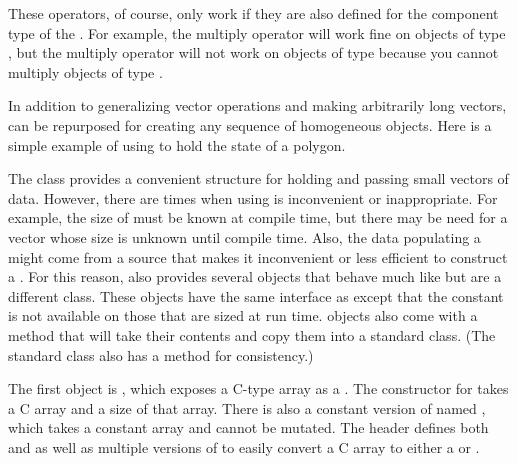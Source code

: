 
These operators, of course, only work if they are also defined for the
component type of the . For example, the multiply operator will
work fine on objects of type , but the multiply
operator will not work on objects of type 
because you cannot multiply objects of type .

In addition to generalizing vector operations and making arbitrarily long
vectors,  can be repurposed for creating any sequence of
homogeneous objects. Here is a simple example of using  to hold
the state of a polygon.



The  class provides a convenient structure for holding and passing small vectors of data.
However, there are times when using  is inconvenient or inappropriate.
For example, the size of  must be known at compile time, but there may be need for a vector whose size is unknown until compile time.
Also, the data populating a  might come from a source that makes it inconvenient or less efficient to construct a .
For this reason, \VTKm also provides several \keyterm{\Veclike} objects that behave much like  but are a different class.
These \Veclike objects have the same interface as  except that the  constant is not available on those that are sized at run time.
\Veclike objects also come with a  method that will take their contents and copy them into a standard  class.
(The standard  class also has a  method for consistency.)

The first \Veclike object is , which exposes a C-type array as a .
The constructor for  takes a C array and a size of that array.
There is also a constant version of  named , which takes a constant array and cannot be mutated.
The  header defines both  and  as well as multiple versions of  to easily convert a C array to either a  or .

